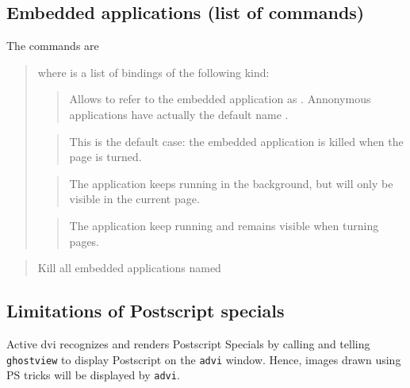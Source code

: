 \documentclass[12pt]{article}
\begin{document}

\newpage

\subsection* {Embedded applications (list of commands)}

The commands are 

\medskip\noindent
\docdef \adviembed{} 

\begin{quote}
where  is a list of bindings of the following kind:

\begin{quote}
Allows to refer to the embedded application as . 
Annonymous applications have actually the default name .
\end{quote}


\begin{quote}
This is the default case: the embedded application is killed when the page
is turned.
\end{quote}


\begin{quote}
The application keeps running in the background, but will only be visible in
the current page.
\end{quote}

\begin{quote}
The application keep running and remains visible when turning pages.
\end{quote}

\end{quote}

\medskip\noindent
\docdef \advikillembed {}
\begin{quote}
Kill all embedded applications named 
\end{quote}

\newpage

\subsection* {Limitations of Postscript specials}

Active dvi recognizes and renders Postscript Specials by calling and telling
\verb"ghostview" to display Postscript on the \verb"advi" window. 
Hence, images drawn using PS tricks will be displayed by \verb"advi". 
\end{document}
